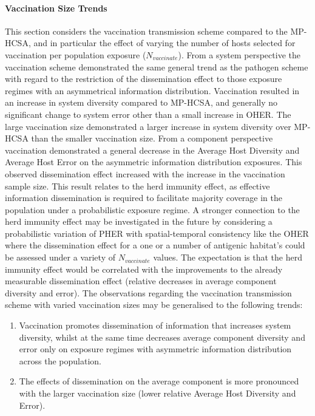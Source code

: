 \paragraph{Vaccination Size Trends}
This section considers the vaccination transmission scheme compared to the MP-HCSA, and in particular the effect of varying the number of hosts selected for vaccination per population exposure ($N_{vaccinate}$).
From a system perspective the vaccination scheme demonstrated the same general trend as the pathogen scheme with regard to the restriction of the dissemination effect to those exposure regimes with an asymmetrical information distribution. Vaccination resulted in an increase in system diversity compared to MP-HCSA, and generally no significant change to system error other than a small increase in OHER. The large vaccination size demonstrated a larger increase in system diversity over MP-HCSA than the smaller vaccination size.
From a component perspective vaccination demonstrated a general decrease in the Average Host Diversity and Average Host Error on the asymmetric information distribution exposures. This observed dissemination effect increased with the increase in the vaccination sample size. This result relates to the herd immunity effect, as effective information dissemination is required to facilitate majority coverage in the population under a probabilistic exposure regime. 
A stronger connection to the herd immunity effect may be investigated in the future by considering a probabilistic variation of PHER with spatial-temporal consistency like the OHER where the dissemination effect for a one or a number of antigenic habitat's could be assessed under a variety of $N_{vaccinate}$ values. The expectation is that the herd immunity effect would be correlated with the improvements to the already measurable dissemination effect (relative decreases in average component diversity and error).
The observations regarding the vaccination transmission scheme with varied vaccination sizes may be generalised to the following trends: 

\begin{enumerate}
	\item Vaccination promotes dissemination of information that increases system diversity, whilst at the same time decreases average component diversity and error only on exposure regimes with asymmetric information distribution across the population.
	\item The effects of dissemination on the average component is more pronounced with the larger vaccination size (lower relative Average Host Diversity and Error). 
\end{enumerate}

